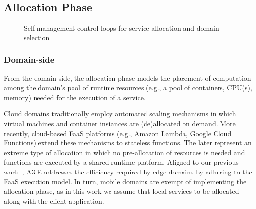 \subsection{Allocation Phase}\label{sec:A3-E-allocation}

\begin{figure}[thbp]
	\centering
	\captionsetup[subfigure]{width=0.4\textwidth}	
	\null\hfill
	\captionsetup[subfigure]{width=0.4\textwidth}	
	\hfill
	\hfill\null
	\caption{Self-management control loops for service allocation and domain selection}\label{fig:allocation-loops}
\end{figure}

\subsubsection*{Domain-side} From the domain side, the allocation phase models the placement of computation among the domain's pool of runtime resources (e.g., a pool of containers, CPU(s), memory) needed for the execution of a service. 

Cloud domains traditionally employ automated scaling mechanisms in which virtual machines and container instances are (de)allocated on demand. More recently, cloud-based FaaS platforms (e.g., Amazon Lambda, Google Cloud Functions) extend these mechanisms to stateless functions. The later represent an extreme type of allocation in which no pre-allocation of resources is needed and functions are executed by a shared runtime platform. Aligned to our previous work~\cite{GarrigaMendonca2017}, A3-E addresses the efficiency required by edge domains by adhering to the FaaS execution model.
In turn, mobile domains are exempt of implementing the allocation phase, as in this work we assume that local services to be allocated along with the client application.

